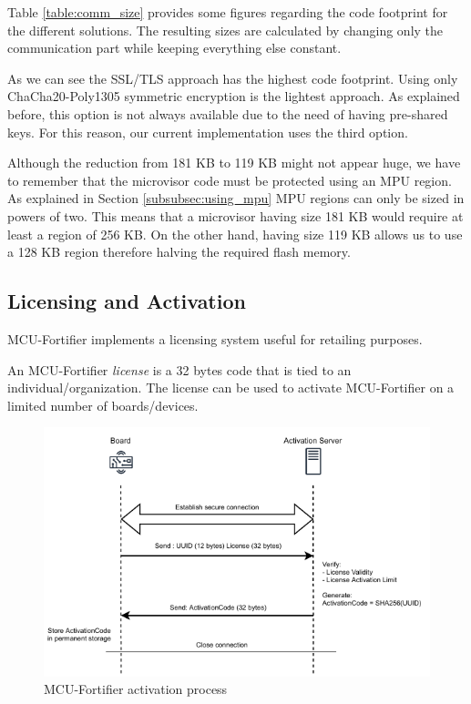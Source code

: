 \documentclass{article}
\begin{document}
Table \ref{table:comm_size} provides some figures regarding the code footprint for the different solutions. The resulting sizes are calculated by changing only the communication part while keeping everything else constant.

As we can see the SSL/TLS approach has the highest code footprint. Using only ChaCha20-Poly1305 symmetric encryption is the lightest approach. As explained before, this option is not always available due to the need of having pre-shared keys. For this reason, our current implementation uses the third option.

Although the reduction from 181 KB to 119 KB might not appear huge, we have to remember that the microvisor code must be protected using an MPU region. As explained in Section \ref{subsubsec:using_mpu} MPU regions can only be sized in powers of two. This means that a microvisor having size 181 KB would require at least a region of 256 KB. On the other hand, having size 119 KB allows us to use a 128 KB region therefore halving the required flash memory.

\subsection{Licensing and Activation}
\label{subsec:activation}
MCU-Fortifier implements a licensing system useful for retailing purposes.

An MCU-Fortifier \textit{license} is a 32 bytes code that is tied to an individual/organization. The license can be used to activate MCU-Fortifier on a limited number of boards/devices.

\begin{figure}
	\centering
	\includegraphics[scale=1.2]{images/activation.pdf}
	\caption{MCU-Fortifier activation process}
	\label{fig:activation}
\end{figure}
\end{document}
